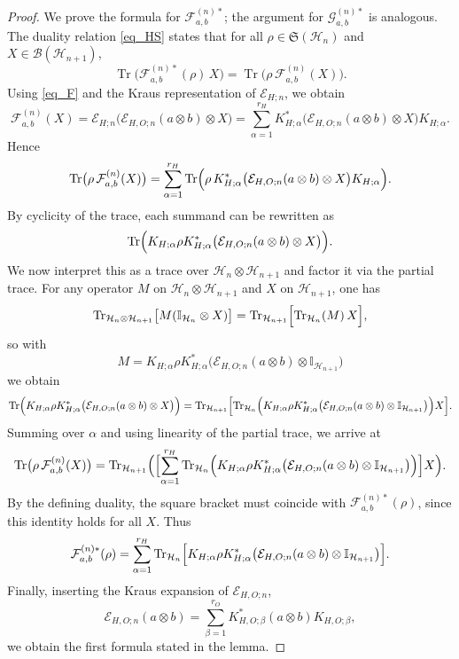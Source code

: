 \documentclass[11pt, reco]{article}
\begin{document}
\begin{proof}
We prove the formula for $\mathcal{F}_{a,b}^{(n)*}$; the argument for $\mathcal{G}_{a,b}^{(n)*}$ is analogous. The duality relation \eqref{eq_HS} states that for all $\rho\in\mathfrak{S}(\mathcal{H}_n)$ and $X\in\mathcal{B}(\mathcal{H}_{n+1})$,
\[
\operatorname{Tr}\bigl(\mathcal{F}_{a,b}^{(n)*}(\rho)\,X\bigr)
=
\operatorname{Tr}\bigl(\rho\,\mathcal{F}_{a,b}^{(n)}(X)\bigr).
\]
Using \eqref{eq_F} and the Kraus representation of $\mathcal{E}_{H;n}$, we obtain
\[
\mathcal{F}_{a,b}^{(n)}(X)
=
\mathcal{E}_{H;n}\bigl(\mathcal{E}_{H,O;n}(a\otimes b)\otimes X\bigr)
=
\sum_{\alpha=1}^{r_H}
K_{H;\alpha}^{*}\bigl(\mathcal{E}_{H,O;n}(a\otimes b)\otimes X\bigr)K_{H;\alpha}.
\]
Hence
\[
\operatorname{Tr}\bigl(\rho\,\mathcal{F}_{a,b}^{(n)}(X)\bigr)
=
\sum_{\alpha=1}^{r_H}
\operatorname{Tr}\Bigl(\rho\,K_{H;\alpha}^{*}\bigl(\mathcal{E}_{H,O;n}(a\otimes b)\otimes X\bigr)K_{H;\alpha}\Bigr).
\]
By cyclicity of the trace, each summand can be rewritten as
\[
\operatorname{Tr}\Bigl(K_{H;\alpha}\rho K_{H;\alpha}^{*}\bigl(\mathcal{E}_{H,O;n}(a\otimes b)\otimes X\bigr)\Bigr).
\]
We now interpret this as a trace over $\mathcal{H}_n\otimes\mathcal{H}_{n+1}$ and factor it via the partial trace. For any operator $M$ on $\mathcal{H}_n\otimes\mathcal{H}_{n+1}$ and $X$ on $\mathcal{H}_{n+1}$, one has
\[
\operatorname{Tr}_{\mathcal{H}_n\otimes\mathcal{H}_{n+1}}\bigl[M(\mathbb{I}_{\mathcal{H}_n}\otimes X)\bigr]
=
\operatorname{Tr}_{\mathcal{H}_{n+1}}\Bigl[\operatorname{Tr}_{\mathcal{H}_n}(M)\,X\Bigr],
\]
so with
\[
M
=
K_{H;\alpha}\rho K_{H;\alpha}^{*}
\bigl(\mathcal{E}_{H,O;n}(a\otimes b)\otimes\mathbb{I}_{\mathcal{H}_{n+1}}\bigr)
\]
we obtain
\[
\operatorname{Tr}\Bigl(K_{H;\alpha}\rho K_{H;\alpha}^{*}\bigl(\mathcal{E}_{H,O;n}(a\otimes b)\otimes X\bigr)\Bigr)
=
\operatorname{Tr}_{\mathcal{H}_{n+1}}\Bigl[
\operatorname{Tr}_{\mathcal{H}_n}\Bigl(
K_{H;\alpha}\rho K_{H;\alpha}^{*}
\bigl(\mathcal{E}_{H,O;n}(a\otimes b)\otimes\mathbb{I}_{\mathcal{H}_{n+1}}\bigr)
\Bigr)X
\Bigr].
\]
Summing over $\alpha$ and using linearity of the partial trace, we arrive at
\[
\operatorname{Tr}\bigl(\rho\,\mathcal{F}_{a,b}^{(n)}(X)\bigr)
=
\operatorname{Tr}_{\mathcal{H}_{n+1}}\Bigl(
\Bigl[
\sum_{\alpha=1}^{r_H}
\operatorname{Tr}_{\mathcal{H}_n}\Bigl(
K_{H;\alpha}\rho K_{H;\alpha}^{*}
\bigl(\mathcal{E}_{H,O;n}(a\otimes b)\otimes\mathbb{I}_{\mathcal{H}_{n+1}}\bigr)
\Bigr)
\Bigr]X
\Bigr).
\]
By the defining duality, the square bracket must coincide with $\mathcal{F}_{a,b}^{(n)*}(\rho)$, since this identity holds for all $X$. Thus
\[
\mathcal{F}_{a,b}^{(n)*}(\rho)
=
\sum_{\alpha=1}^{r_H}
\operatorname{Tr}_{\mathcal{H}_n}\Bigl[
K_{H;\alpha}\rho K_{H;\alpha}^{*}
\bigl(\mathcal{E}_{H,O;n}(a\otimes b)\otimes\mathbb{I}_{\mathcal{H}_{n+1}}\bigr)
\Bigr].
\]
Finally, inserting the Kraus expansion of $\mathcal{E}_{H,O;n}$,
\[
\mathcal{E}_{H,O;n}(a\otimes b)
=
\sum_{\beta=1}^{r_O}K_{H,O;\beta}^{*}(a\otimes b)K_{H,O;\beta},
\]
we obtain the first formula stated in the lemma.


\end{proof}
\end{document}
